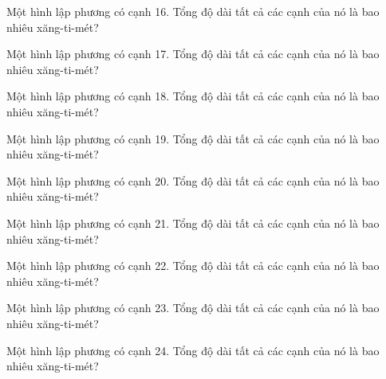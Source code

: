 \begin{ex}
  Một hình lập phương có cạnh 16. Tổng độ dài tất cả các cạnh của nó là bao nhiêu xăng-ti-mét?
\end{ex}

\begin{ex}
  Một hình lập phương có cạnh 17. Tổng độ dài tất cả các cạnh của nó là bao nhiêu xăng-ti-mét?
\end{ex}

\begin{ex}
  Một hình lập phương có cạnh 18. Tổng độ dài tất cả các cạnh của nó là bao nhiêu xăng-ti-mét?
\end{ex}

\begin{ex}
  Một hình lập phương có cạnh 19. Tổng độ dài tất cả các cạnh của nó là bao nhiêu xăng-ti-mét?
\end{ex}

\begin{ex}
  Một hình lập phương có cạnh 20. Tổng độ dài tất cả các cạnh của nó là bao nhiêu xăng-ti-mét?
\end{ex}

\begin{ex}
  Một hình lập phương có cạnh 21. Tổng độ dài tất cả các cạnh của nó là bao nhiêu xăng-ti-mét?
\end{ex}

\begin{ex}
  Một hình lập phương có cạnh 22. Tổng độ dài tất cả các cạnh của nó là bao nhiêu xăng-ti-mét?
\end{ex}

\begin{ex}
  Một hình lập phương có cạnh 23. Tổng độ dài tất cả các cạnh của nó là bao nhiêu xăng-ti-mét?
\end{ex}

\begin{ex}
  Một hình lập phương có cạnh 24. Tổng độ dài tất cả các cạnh của nó là bao nhiêu xăng-ti-mét?
\end{ex}
